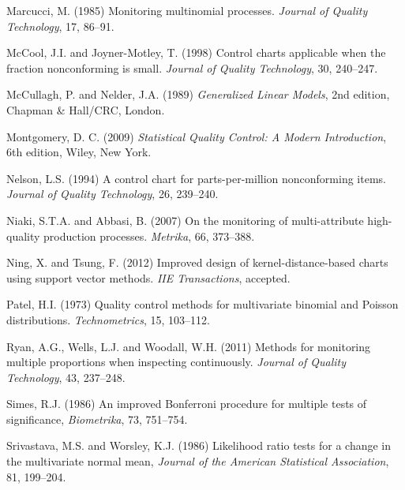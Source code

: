 \begin{thebibliography}{}
\item Marcucci, M. (1985) Monitoring multinomial
processes. {\it Journal of Quality Technology}, 17, 86--91.

\item McCool, J.I. and Joyner-Motley, T. (1998) Control charts applicable when the
fraction nonconforming is small. {\it Journal of Quality Technology}, 30, 240--247.

\item McCullagh, P. and Nelder, J.A. (1989) {\it Generalized Linear Models}, 2nd
edition, Chapman \& Hall/CRC, London.

\item Montgomery, D. C. (2009) {\it Statistical Quality Control: A Modern Introduction}, 6th
edition, Wiley, New York.

\item Nelson, L.S. (1994) A control chart for parts-per-million nonconforming
items. {\it Journal of Quality Technology}, 26, 239--240.

\item Niaki, S.T.A. and Abbasi, B. (2007) On the monitoring of
multi-attribute high-quality production processes. {\it Metrika}, 66, 373--388.

\item Ning, X. and Tsung, F. (2012) Improved design of kernel-distance-based charts
using support vector methods. {\it IIE Transactions}, accepted.

\item Patel, H.I. (1973) Quality control methods for
multivariate binomial and Poisson distributions. {\it Technometrics}, 15, 103--112.

\item Ryan, A.G., Wells, L.J. and Woodall, W.H. (2011) Methods for monitoring
multiple proportions when inspecting continuously. {\it Journal of Quality
Technology}, 43, 237--248.


\item Simes, R.J. (1986) An improved Bonferroni procedure for multiple tests of
significance, {\it Biometrika}, 73, 751--754.

\item Srivastava, M.S. and Worsley, K.J. (1986) Likelihood ratio tests for a change in
the multivariate normal mean, {\it Journal of the American Statistical Association},
81, 199--204.


\end{thebibliography}
